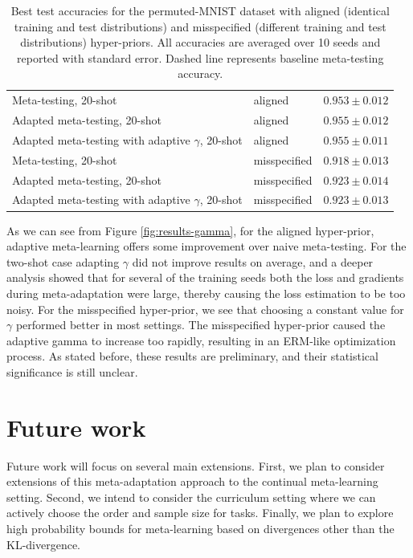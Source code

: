 \documentclass{article}
\theoremstyle{definition}
\begin{document}
\begin{table}
\begin{tabular}{lll}
		Meta-testing, 20-shot & aligned   & $0.953\pm 0.012 $      \\
		Adapted meta-testing, 20-shot & aligned   & $0.955\pm 0.012$      \\
		Adapted meta-testing with adaptive $\gamma$, 20-shot & aligned   & $0.955\pm 0.011$      \\
		\midrule
		Meta-testing, 20-shot & misspecified   & $0.918\pm 0.013 $      \\
		Adapted meta-testing, 20-shot & misspecified   & $0.923\pm 0.014$      \\
		Adapted meta-testing with adaptive $\gamma$, 20-shot & misspecified   & $0.923\pm 0.013$    \\
		\midrule
		\bottomrule
	\end{tabular}
	\caption{Best test accuracies for the permuted-MNIST dataset with aligned (identical training and test distributions) and misspecified (different training and test distributions) hyper-priors. All accuracies are averaged over 10 seeds and reported with standard error. Dashed line represents baseline meta-testing accuracy.}
	\label{table:gamma}
\end{table}


As we can see from Figure \ref{fig:results-gamma}, for the aligned hyper-prior, adaptive meta-learning offers some improvement over naive meta-testing. For the two-shot case adapting $\gamma$ did not improve results on average, and a deeper analysis showed that for several of the training seeds both the loss and gradients during meta-adaptation were large, thereby causing the loss estimation to be too noisy. 
For the misspecified hyper-prior, we see that choosing a constant value for $\gamma$ performed better in most settings. The misspecified hyper-prior caused the adaptive gamma to increase too rapidly, resulting in an ERM-like optimization process.
As stated before, these results are preliminary, and their statistical significance is still unclear.

\section{Future work}

Future work will focus on several main extensions. First, we plan to consider extensions of this meta-adaptation approach to the continual meta-learning setting. Second, we intend to consider the curriculum setting where we can actively choose the order and sample size for tasks. Finally, we plan to explore high probability bounds for meta-learning based on divergences other than the KL-divergence.
\end{document}

